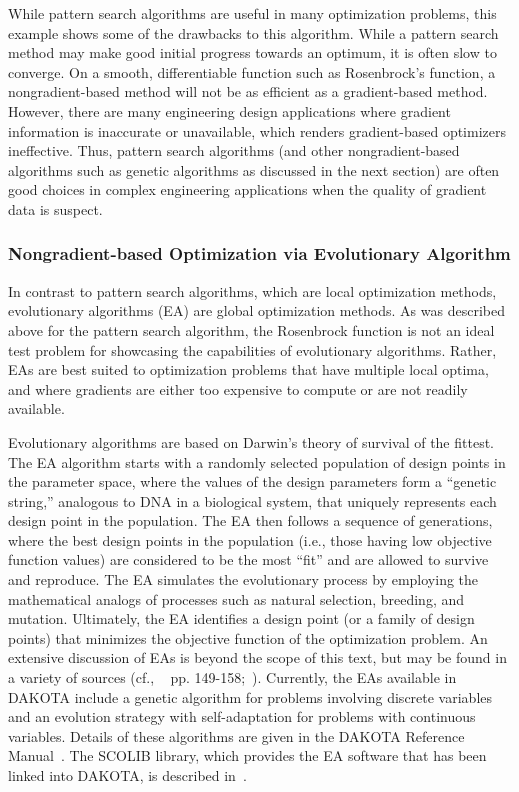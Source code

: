 While pattern search algorithms are useful in many optimization
problems, this example shows some of the drawbacks to this algorithm.
While a pattern search method may make good initial progress towards
an optimum, it is often slow to converge. On a smooth, differentiable
function such as Rosenbrock's function, a nongradient-based method
will not be as efficient as a gradient-based method. However, there
are many engineering design applications where gradient information is
inaccurate or unavailable, which renders gradient-based optimizers
ineffective. Thus, pattern search algorithms (and other
nongradient-based algorithms such as genetic algorithms as discussed in the
next section) are often good choices in complex engineering applications
when the quality of gradient data is suspect.

\subsubsection{Nongradient-based Optimization via Evolutionary Algorithm}\label{tutorial:example:optimization:nongradient2}

In contrast to pattern search algorithms, which are local optimization
methods, evolutionary algorithms (EA) are global optimization
methods. As was described above for the pattern search algorithm, the
Rosenbrock function is not an ideal test problem for showcasing the
capabilities of evolutionary algorithms. Rather, EAs are best suited
to optimization problems that have multiple local optima, and where
gradients are either too expensive to compute or are not readily available.

Evolutionary algorithms are based on Darwin's theory of survival of
the fittest. The EA algorithm starts with a randomly selected
population of design points in the parameter space, where the values
of the design parameters form a ``genetic string,'' analogous
to DNA in a biological system, that uniquely represents each design
point in the population. The EA then follows a sequence of
generations, where the best design points in the population (i.e.,
those having low objective function values) are considered to be the
most ``fit'' and are allowed to survive and reproduce. The EA
simulates the evolutionary process by employing the mathematical
analogs of processes such as natural selection, breeding, and
mutation. Ultimately, the EA identifies a design point (or a family of
design points) that minimizes the objective function of the
optimization problem. An extensive discussion of EAs is beyond the
scope of this text, but may be found in a variety of sources (cf.,
~\cite{Haf92} pp. 149-158;~\cite{Gol89}). Currently, the EAs available
in DAKOTA include a genetic algorithm for problems involving discrete
variables and an evolution strategy with self-adaptation for problems
with continuous variables. Details of these algorithms are given in
the DAKOTA Reference Manual~\cite{RefMan}. The SCOLIB library, which
provides the EA software that has been linked into DAKOTA, is
described in~\cite{Har06}.

